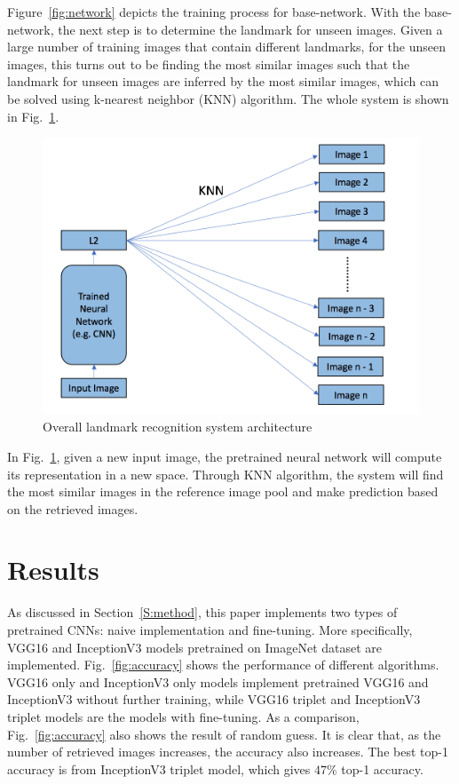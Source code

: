 \documentclass[final,3p]{elsarticle}
\begin{document}
Figure~\ref{fig:network} depicts the training process for base-network. With the base-network, the next step is to determine the landmark for unseen images. Given a large number of training images that contain different landmarks, for the unseen images, this turns out to be finding the most similar images such that the landmark for unseen images are inferred by the most similar images, which can be solved using k-nearest neighbor (KNN) algorithm. The whole system is shown in Fig.~\ref{fig:system}.

\begin{figure}[hbtp]
\centering\includegraphics[width=0.8\linewidth]{./figures/system.png}
\caption{Overall landmark recognition system architecture}
\label{fig:system}
\end{figure}

In Fig.~\ref{fig:system}, given a new input image, the pretrained neural network will compute its representation in a new space. Through KNN algorithm, the system will find the most similar images in the reference image pool and make prediction based on the retrieved images.

\section{Results}
\label{S:result}

As discussed in Section~\ref{S:method}, this paper implements two types of pretrained CNNs: naive implementation and fine-tuning. More specifically, VGG16 and InceptionV3 models pretrained on ImageNet dataset are implemented. Fig.~\ref{fig:accuracy} shows the performance of different algorithms. VGG16 only and InceptionV3 only models implement pretrained VGG16 and InceptionV3 without further training, while VGG16 triplet and InceptionV3 triplet models are the models with fine-tuning. As a comparison, Fig.~\ref{fig:accuracy} also shows the result of random guess. It is clear that, as the number of retrieved images increases, the accuracy also increases. The best top-1 accuracy is from InceptionV3 triplet model, which gives $47\%$ top-1 accuracy.
\end{document}
